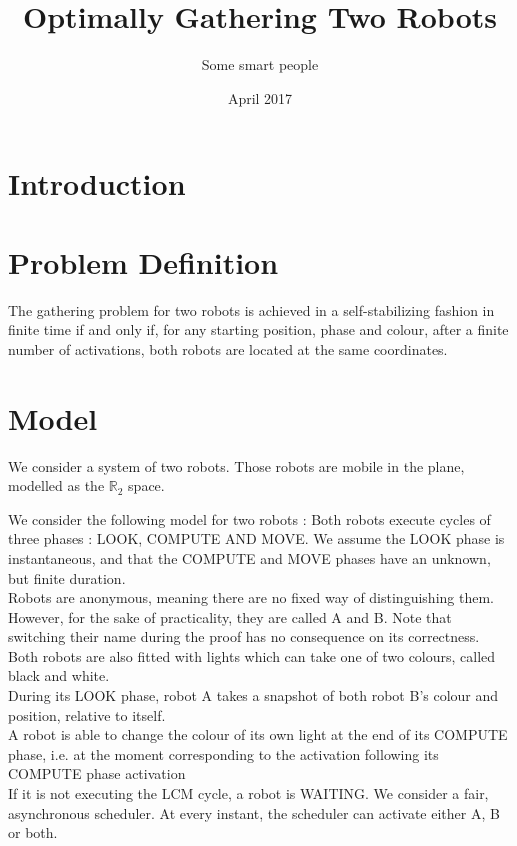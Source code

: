 \documentclass[11pt]{article}
\title{Optimally Gathering Two Robots}
\author{Some smart people}
\date{April 2017}
\begin{document}
\maketitle

\section{Introduction}


\section{Problem Definition}


The gathering problem for two robots is achieved in a self-stabilizing fashion in finite time if and only if, for any starting position, phase and colour, after a finite number of activations, both robots are located at the same coordinates.

\section{Model}

We consider a system of two robots. Those robots are mobile in the plane, modelled as the $\mathbb{R}_2$ space.

We consider the following model for two robots : 
Both robots execute cycles of three phases : LOOK, COMPUTE AND MOVE.
We assume the LOOK phase is instantaneous, and that the COMPUTE and MOVE phases have an unknown, but finite duration.
\\
Robots are anonymous, meaning there are no fixed way of distinguishing them. However, for the sake of practicality, they are called A and B. Note that switching their name during the proof has no consequence on its correctness.
\\
Both robots are also fitted with lights which can take one of two colours, called black and white.
\\
During its LOOK phase, robot A takes a snapshot of both robot B's colour and position, relative to itself.
\\
A robot is able to change the colour of its own light at the end of its COMPUTE phase, i.e. at the moment corresponding to the activation following its COMPUTE phase activation
\\
If it is not executing the LCM cycle, a robot is WAITING.
We consider a fair, asynchronous scheduler. 
At every instant, the scheduler can activate either A, B or both.
\end{document}
